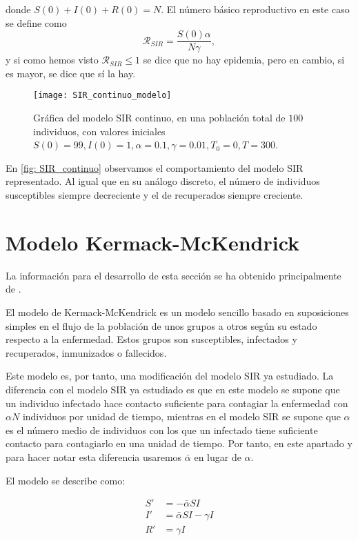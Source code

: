donde $S(0)+I(0)+R(0)=N$. El número básico reproductivo en este caso se define como
$$\mathcal{R}_{SIR}=\frac{S(0)\alpha }{N\gamma },$$
y si como hemos visto $\mathcal{R}_{SIR}\leq 1$  se dice que no hay epidemia, pero en cambio, si es mayor, se dice que sí la hay.

\begin{figure}
\begin{center}
\caption{Gráfica del modelo SIR continuo, en una población total de $100$ individuos, con valores iniciales $S(0)=99, I(0) = 1, \alpha = 0.1, \gamma = 0.01, T_0 = 0, T = 300$.}
\label{fig: SIR_continuo}
\texttt{[image: SIR\_continuo\_modelo]}
\end{center}
\end{figure}

En \eqref{fig: SIR_continuo} observamos el comportamiento del modelo SIR representado. Al igual que en su análogo discreto, el número de individuos susceptibles siempre decreciente y el de recuperados siempre creciente.

\section{Modelo Kermack-McKendrick}

La información para el desarrollo de esta sección se ha obtenido principalmente de \cite{brauerMathematicalModelsPopulation2012}.

El modelo de Kermack-McKendrick es un modelo sencillo basado en suposiciones simples en el flujo de la población de unos grupos a otros según su estado respecto a la enfermedad. Estos grupos son susceptibles, infectados y recuperados, inmunizados o fallecidos.

Este modelo es, por tanto, una modificación del modelo SIR ya estudiado. La diferencia con el modelo SIR ya estudiado es que en este modelo se supone que un individuo infectado hace contacto suficiente para contagiar la enfermedad con $\alpha N$ individuos por unidad de tiempo, mientras en el modelo SIR se supone que $\alpha$ es el número medio de individuos con los que un infectado tiene suficiente contacto para contagiarlo en una unidad de tiempo. Por tanto, en este apartado y para hacer notar esta diferencia usaremos $\bar{\alpha}$ en lugar de $\alpha$.

El modelo se describe como:

\begin{equation}
\label{eqn: KMK}
\begin{aligned}
S' & = -\bar{\alpha} SI \\
I' & = \bar{\alpha} SI - \gamma I \\
R' & = \gamma I
\end{aligned}
\end{equation}

